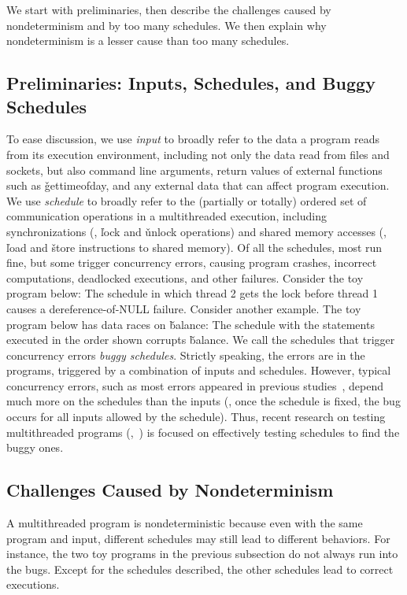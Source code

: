 We start with preliminaries, then describe the challenges caused by
nondeterminism and by too many schedules.  We then explain why
nondeterminism is a lesser cause than too many schedules.

\subsection{Preliminaries: Inputs, Schedules, and Buggy Schedules}

To ease discussion, we use \emph{input} to broadly refer to the data a
program reads from its execution environment, including not only the data
read from files and sockets, but also command line arguments, return
values of external functions such as \v{gettimeofday}, and any external data that can affect program
execution.  We use \emph{schedule} to broadly refer to the (partially or
totally) ordered set of communication operations in a multithreaded
execution, including synchronizations (\eg, \v{lock} and
\v{unlock} operations) and shared memory accesses (\eg, \v{load} and
\v{store} instructions to shared memory). Of all the schedules, most run
fine, but some trigger concurrency errors, causing program crashes,
incorrect computations, deadlocked executions, and other failures.
Consider the toy program below: 
\noindent The schedule in which thread 2 gets the lock before thread 1
causes a dereference-of-NULL failure.  Consider another example.  The toy program
below has data races on \v{balance}: 
\noindent 
The schedule with the statements executed in the order shown corrupts
\v{balance}. We call the schedules that trigger concurrency errors
\emph{buggy schedules}.  Strictly speaking, the errors are in the
programs, triggered by a combination of inputs and schedules.  However,
typical concurrency errors, such as most errors appeared in previous
studies~\cite{lu:concurrency-bugs,con:hotpar12}, depend much more on the
schedules than the inputs (\eg, once the schedule is fixed, the bug
occurs for all inputs allowed by the schedule).  Thus, recent research on
testing multithreaded programs (\eg,~\cite{musuvathi:chess:osdi08}) is
focused on effectively testing schedules to find the buggy ones.

\subsection{Challenges Caused by Nondeterminism} \label{sec:nondet}

A multithreaded program is nondeterministic because even with the same
program and input, different schedules may still lead to different
behaviors.  For instance, the two toy programs in the previous subsection
do not always run into the bugs.  Except for the schedules described, the
other schedules lead to correct executions.

